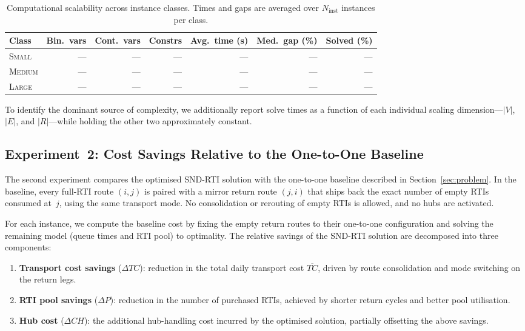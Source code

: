 \begin{table}[ht]
\centering
\caption{Computational scalability across instance classes.
  Times and gaps are averaged over $N_{\text{inst}}$ instances
  per class.}
\label{tab:scalability}
\small
\begin{tabular}{lrrrrrr}
\toprule
\textbf{Class}
  & \textbf{Bin.\ vars}
  & \textbf{Cont.\ vars}
  & \textbf{Constrs}
  & \textbf{Avg.\ time (s)}
  & \textbf{Med.\ gap (\%)}
  & \textbf{Solved (\%)} \\
\midrule
\textsc{Small}  & --- & --- & --- & --- & --- & --- \\
\textsc{Medium} & --- & --- & --- & --- & --- & --- \\
\textsc{Large}  & --- & --- & --- & --- & --- & --- \\
\bottomrule
\end{tabular}
\end{table}

To identify the dominant source of complexity, we additionally
report solve times as a function of each individual scaling
dimension---$|V|$, $|E|$, and $|R|$---while holding the other two
approximately constant.


\subsection{Experiment~2: Cost Savings Relative to the One-to-One Baseline}
\label{sec:exp-baseline}

The second experiment compares the optimised SND-RTI solution with
the one-to-one baseline described in Section~\ref{sec:problem}. In
the baseline, every full-RTI route $(i,j)$ is paired with a mirror
return route $(j,i)$ that ships back the exact number of empty RTIs
consumed at~$j$, using the same transport mode. No consolidation or
rerouting of empty RTIs is allowed, and no hubs are activated.

For each instance, we compute the baseline cost by fixing the empty
return routes to their one-to-one configuration and solving the
remaining model (queue times and RTI pool) to optimality. The
relative savings of the SND-RTI solution are decomposed into three
components:

\begin{enumerate}
  \item \textbf{Transport cost savings}
        ($\Delta TC$): reduction in the total daily transport cost
        $\overline{TC}$, driven by route consolidation and mode
        switching on the return legs.
  \item \textbf{RTI pool savings}
        ($\Delta P$): reduction in the number of purchased RTIs,
        achieved by shorter return cycles and better pool
        utilisation.
  \item \textbf{Hub cost}
        ($\Delta CH$): the additional hub-handling cost incurred
        by the optimised solution, partially offsetting the above
        savings.
\end{enumerate}

